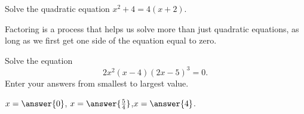 \documentclass{ximera}
\begin{document}
\begin{problem}
	Solve the quadratic equation $\displaystyle x^2 + 4 = 4\left(x+2\right)$.
	\begin{multipleChoice}
  \end{multipleChoice}
\end{problem}




%		
%
Factoring is a process that helps us solve more than just quadratic equations, as long as we first get one side of the equation equal to zero.
\begin{problem}
	Solve the equation
	\[ 2x^2 \left( x-4 \right) \left( 2x-5\right)^3 = 0. \] Enter your answers from smallest to largest value.
	\begin{prompt}
		$x=\answer{0}$, $x=\answer{\frac{5}{4}}$,$x=\answer{4}$.
	\end{prompt}

\end{problem}

%
%		
\end{document}
